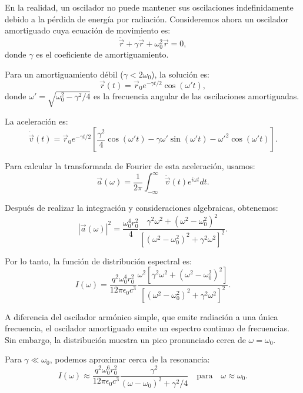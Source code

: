 \documentclass[12pt,a4paper]{book}
\begin{document}
En la realidad, un oscilador no puede mantener sus oscilaciones indefinidamente debido a la pérdida de energía por radiación. Consideremos ahora un oscilador amortiguado cuya ecuación de movimiento es:
\begin{equation}
\ddot{\vec{r}} + \gamma\dot{\vec{r}} + \omega_0^2\vec{r} = 0,
\end{equation}
donde $\gamma$ es el coeficiente de amortiguamiento.

Para un amortiguamiento débil ($\gamma < 2\omega_0$), la solución es:
\begin{equation}
\vec{r}(t) = \vec{r}_0e^{-\gamma t/2}\cos(\omega't),
\end{equation}
donde $\omega' = \sqrt{\omega_0^2 - \gamma^2/4}$ es la frecuencia angular de las oscilaciones amortiguadas.

La aceleración es:
\begin{equation}
\dot{\vec{v}}(t) = \vec{r}_0e^{-\gamma t/2}\left[\frac{\gamma^2}{4}\cos(\omega't) - \gamma\omega'\sin(\omega't) - \omega'^2\cos(\omega't)\right].
\end{equation}

Para calcular la transformada de Fourier de esta aceleración, usamos:
\begin{equation}
\vec{a}(\omega) = \frac{1}{2\pi}\int_{-\infty}^{\infty}\dot{\vec{v}}(t)e^{i\omega t}dt.
\end{equation}

Después de realizar la integración y consideraciones algebraicas, obtenemos:
\begin{equation}
|\vec{a}(\omega)|^2 = \frac{\omega_0^4r_0^2}{4}\frac{\gamma^2\omega^2 + (\omega^2 - \omega_0^2)^2}{[(\omega^2 - \omega_0^2)^2 + \gamma^2\omega^2]^2}.
\end{equation}

Por lo tanto, la función de distribución espectral es:
\begin{equation}
I(\omega) = \frac{q^2\omega_0^4r_0^2}{12\pi\epsilon_0c^3}\frac{\omega^2[\gamma^2\omega^2 + (\omega^2 - \omega_0^2)^2]}{[(\omega^2 - \omega_0^2)^2 + \gamma^2\omega^2]^2}.
\end{equation}

A diferencia del oscilador armónico simple, que emite radiación a una única frecuencia, el oscilador amortiguado emite un espectro continuo de frecuencias. Sin embargo, la distribución muestra un pico pronunciado cerca de $\omega = \omega_0$. 

Para $\gamma \ll \omega_0$, podemos aproximar cerca de la resonancia:
\begin{equation}
I(\omega) \approx \frac{q^2\omega_0^6r_0^2}{12\pi\epsilon_0c^3}\frac{\gamma^2}{(\omega - \omega_0)^2 + \gamma^2/4} \quad \text{para} \quad \omega \approx \omega_0.
\end{equation}
\end{document}
